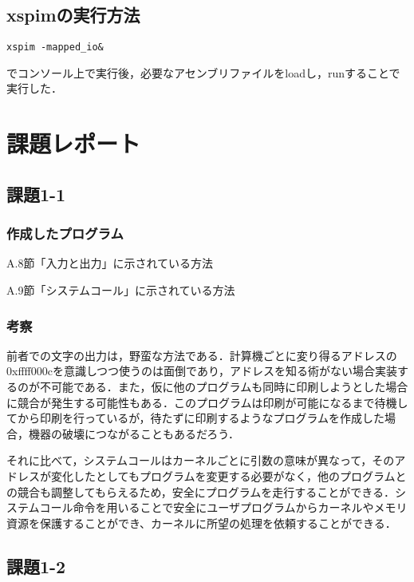 \documentclass[a4j,11pt]{jarticle}
\begin{document}
\subsection{xspimの実行方法}
\begin{verbatim}
xspim -mapped_io&
\end{verbatim}
でコンソール上で実行後，必要なアセンブリファイルをloadし，runすることで実行した．
\section{課題レポート}
 \subsection{課題1-1}
  \subsubsection{作成したプログラム}
  \begin{screen}
    A.8節「入力と出力」に示されている方法
  \end{screen}
  

  \begin{screen}
    A.9節「システムコール」に示されている方法
    \end{screen}
  

  \subsubsection{考察}
  前者での文字の出力は，野蛮な方法である．計算機ごとに変り得るアドレスの0xffff000cを意識しつつ使うのは面倒であり，アドレスを知る術がない場合実装するのが不可能である．また，仮に他のプログラムも同時に印刷しようとした場合に競合が発生する可能性もある．このプログラムは印刷が可能になるまで待機してから印刷を行っているが，待たずに印刷するようなプログラムを作成した場合，機器の破壊につながることもあるだろう．

それに比べて，システムコールはカーネルごとに引数の意味が異なって，そのアドレスが変化したとしてもプログラムを変更する必要がなく，他のプログラムとの競合も調整してもらえるため，安全にプログラムを走行することができる．システムコール命令を用いることで安全にユーザプログラムからカーネルやメモリ資源を保護することができ、カーネルに所望の処理を依頼することができる．

 \subsection{課題1-2}
\end{document}
